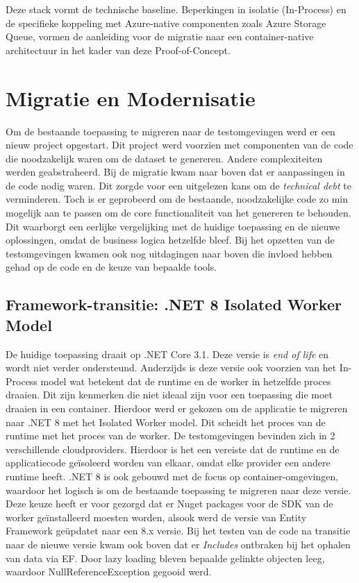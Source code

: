 Deze stack vormt de technische baseline. Beperkingen in isolatie (In-Process) en de specifieke koppeling met Azure-native componenten zoals Azure Storage Queue, vormen de aanleiding voor de migratie naar een container-native architectuur in het kader van deze Proof-of-Concept.

\section{Migratie en Modernisatie}

Om de bestaande toepassing te migreren naar de testomgevingen werd er een nieuw project opgestart. Dit project werd voorzien met componenten van de code die noodzakelijk waren om de dataset te genereren. Andere complexiteiten werden geabstraheerd.
Bij de migratie kwam naar boven dat er aanpassingen in de code nodig waren. Dit zorgde voor een uitgelezen kans om de \textit{technical debt} te verminderen. Toch is er geprobeerd om de bestaande, noodzakelijke code zo min mogelijk aan te passen om de core functionaliteit van het genereren te behouden. Dit waarborgt een eerlijke vergelijking met de huidige toepassing en de nieuwe oplossingen, omdat de business logica hetzelfde bleef. Bij het opzetten van de testomgevingen kwamen ook nog uitdagingen naar boven die invloed hebben gehad op de code en de keuze van bepaalde tools. 

\subsection{Framework-transitie: .NET 8 Isolated Worker Model}

De huidige toepassing draait op .NET Core 3.1. Deze versie is \textit{end of life} en wordt niet verder ondersteund. Anderzijds is deze versie ook voorzien van het In-Process model wat betekent dat de runtime en de worker in hetzelfde proces draaien. Dit zijn kenmerken die niet ideaal zijn voor een toepassing die moet draaien in een container. Hierdoor werd er gekozen om de applicatie te migreren naar .NET 8 met het Isolated Worker model. Dit scheidt het proces van de runtime met het proces van de worker. De testomgevingen bevinden zich in 2 verschillende cloudproviders. Hierdoor is het een vereiste dat de runtime en de applicatiecode geïsoleerd worden van elkaar, omdat elke provider een andere runtime heeft. .NET 8 is ook gebouwd met de focus op container-omgevingen, waardoor het logisch is om de bestaande toepassing te migreren naar deze versie. Deze keuze heeft er voor gezorgd dat er Nuget packages voor de SDK van de worker geïnstalleerd moesten worden, alsook werd de versie van Entity Framework geüpdatet naar een 8.x versie. Bij het testen van de code na transitie naar de nieuwe versie kwam ook boven dat er \textit{Includes} ontbraken bij het ophalen van data via EF. Door lazy loading bleven bepaalde gelinkte objecten leeg, waardoor NullReferenceException gegooid werd. 

